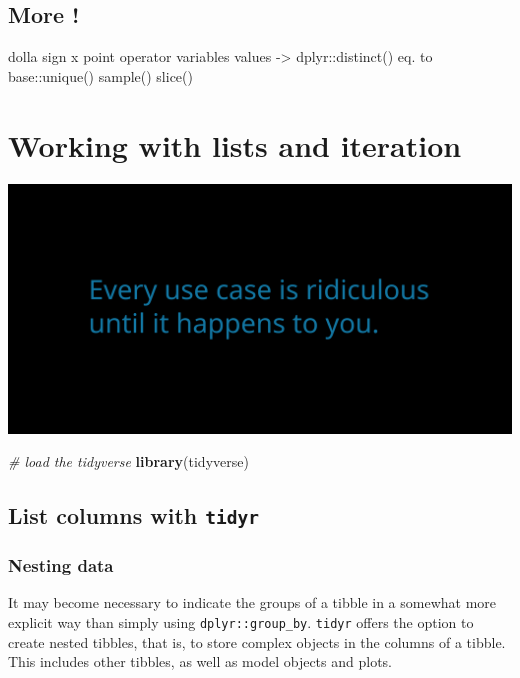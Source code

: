 \documentclass[]{book}
\newenvironment{Shaded}{}{}
\newcommand{\CommentTok}[1]{\textcolor[rgb]{0.38,0.63,0.69}{\textit{#1}}}
\newcommand{\KeywordTok}[1]{\textcolor[rgb]{0.00,0.44,0.13}{\textbf{#1}}}
\newcommand{\NormalTok}[1]{#1}
\begin{document}
\hypertarget{more}{%
\section{More !}\label{more}}

dolla sign x point operator
variables values -\textgreater{} dplyr::distinct() eq. to base::unique()
sample()
slice()

\hypertarget{working-with-lists-and-iteration}{%
\chapter{Working with lists and iteration}\label{working-with-lists-and-iteration}}

\includegraphics{opening-image.png}

\begin{Shaded}
\begin{Highlighting}[]
\CommentTok{# load the tidyverse}
\KeywordTok{library}\NormalTok{(tidyverse)}
\end{Highlighting}
\end{Shaded}

\hypertarget{list-columns-with-tidyr}{%
\section{\texorpdfstring{List columns with \texttt{tidyr}}{List columns with tidyr}}\label{list-columns-with-tidyr}}

\hypertarget{nesting-data}{%
\subsection{Nesting data}\label{nesting-data}}

It may become necessary to indicate the groups of a tibble in a somewhat more explicit way than simply using \texttt{dplyr::group\_by}. \texttt{tidyr} offers the option to create nested tibbles, that is, to store complex objects in the columns of a tibble. This includes other tibbles, as well as model objects and plots.
\end{document}
